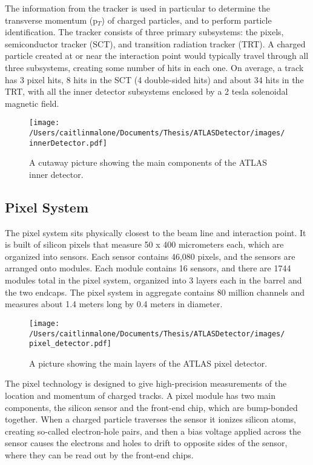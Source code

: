 The information from the tracker is used in particular to determine the transverse momentum (p$_T$) of charged particles, and to perform particle identification.  The tracker consists of three primary subsystems: the pixels, semiconductor tracker (SCT), and transition radiation tracker (TRT).  A charged particle created at or near the interaction point would typically travel through all three subsystems, creating some number of hits in each one.  On average, a track has 3 pixel hits, 8 hits in the SCT (4 double-sided hits) and about 34 hits in the TRT, with all the inner detector subsystems enclosed by a 2 tesla solenoidal magnetic field. 


\begin{figure}
	\texttt{[image: /Users/caitlinmalone/Documents/Thesis/ATLASDetector/images/innerDetector.pdf]}
	\label{fig:inner_detector}  
	\caption{A cutaway picture showing the main components of the ATLAS inner detector.}
\end{figure}


\subsection{Pixel System}
\label{sec:pixel}
The pixel system sits physically closest to the beam line and interaction point.  It is built of silicon pixels that measure 50 x 400 micrometers each, which are organized into sensors.  Each sensor contains 46,080 pixels, and the sensors are arranged onto modules.  Each module contains 16 sensors, and there are 1744 modules total in the pixel system, organized into 3 layers each in the barrel and the two endcaps.  The pixel system in aggregate contains 80 million channels and measures about 1.4 meters long by 0.4 meters in diameter.

\begin{figure}
	\texttt{[image: /Users/caitlinmalone/Documents/Thesis/ATLASDetector/images/pixel\_detector.pdf]}
	\label{fig:inner_detector}  
	\caption{A picture showing the main layers of the ATLAS pixel detector.}
\end{figure}

The pixel technology is designed to give high-precision measurements of the location and momentum of charged tracks.  A pixel module has two main components, the silicon sensor and the front-end chip, which are bump-bonded together.  When a charged particle traverses the sensor it ionizes silicon atoms, creating so-called electron-hole pairs, and then a bias voltage applied across the sensor causes the electrons and holes to drift to opposite sides of the sensor, where they can be read out by the front-end chips.  

